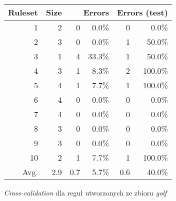 \documentclass{article}
\begin{document}
\begin{itemize}
\begin{figure}
\begin{tabular}{|r|r|rr|rr|}
\hline
 Ruleset & 
 Size & 
 \multicolumn{2}{1|}{Errors} & 
 \multicolumn{2}{1|}{Errors (test)} \\
\hline\hline
       1 &    2 &    0 &  0.0\%  &    0 &   0.0\% \\
       2 &    3 &    0 &  0.0\%  &    1 &  50.0\% \\
       3 &    1 &    4 & 33.3\%  &    1 &  50.0\% \\
       4 &    3 &    1 &  8.3\%  &    2 & 100.0\% \\
       5 &    4 &    1 &  7.7\%  &    1 & 100.0\% \\
       6 &    4 &    0 &  0.0\%  &    0 &   0.0\% \\
       7 &    4 &    0 &  0.0\%  &    0 &   0.0\% \\
       8 &    3 &    0 &  0.0\%  &    0 &   0.0\% \\
       9 &    3 &    0 &  0.0\%  &    0 &   0.0\% \\
      10 &    2 &    1 &  7.7\%  &    1 & 100.0\% \\
\hline\hline
    Avg. &  2.9 &  0.7 &  5.7\%  &  0.6 &  40.0\% \\
\hline
\end{tabular}
\caption{\emph{Cross-validation} dla reguł utworzonych ze zbioru \emph{golf}}
\label{p2t2-golf-rules-cv}
\end{figure}


\end{itemize}
\end{document}
